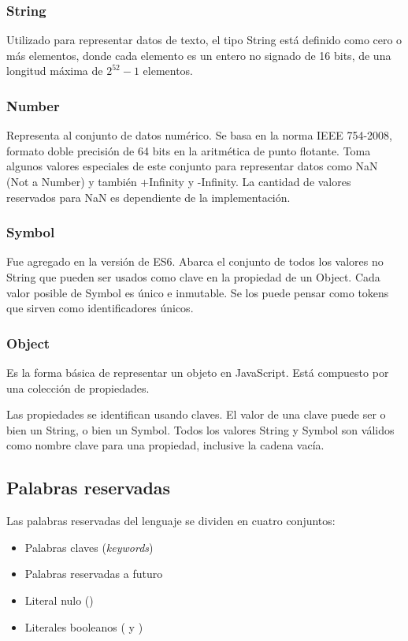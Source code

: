 \subsubsection{String} 
Utilizado para representar datos de texto, el tipo String está definido como cero o más elementos, donde cada elemento es un entero no signado de 16 bits, de una longitud máxima de $2^{52}-1$ elementos.

\subsubsection{Number} 
Representa al conjunto de datos numérico. Se basa en la norma IEEE 754-2008, formato doble precisión de 64 bits en la aritmética de punto flotante. Toma algunos valores especiales de este conjunto para representar datos como NaN (Not a Number) y también +Infinity y -Infinity. La cantidad de valores reservados para NaN es dependiente de la implementación.

\subsubsection{Symbol} 
Fue agregado en la versión de ES6. Abarca el conjunto de todos los valores no String que pueden ser usados como clave en la propiedad de un Object. Cada valor posible de Symbol es único e inmutable. Se los puede pensar como tokens que sirven como identificadores únicos. 

\subsubsection{Object} 
Es la forma básica de representar un objeto en JavaScript. Está compuesto por una colección de propiedades.

Las propiedades se identifican usando claves. El valor de una clave puede ser o bien un String, o bien un Symbol. Todos los valores String y Symbol son válidos como nombre clave para una propiedad, inclusive la cadena vacía. 

\subsection{Palabras reservadas}

Las palabras reservadas del lenguaje se dividen en cuatro conjuntos:

\begin{itemize}
\item Palabras claves (\textit{keywords})
\item Palabras reservadas a futuro
\item Literal nulo ()
\item Literales booleanos ( y )
\end{itemize}

